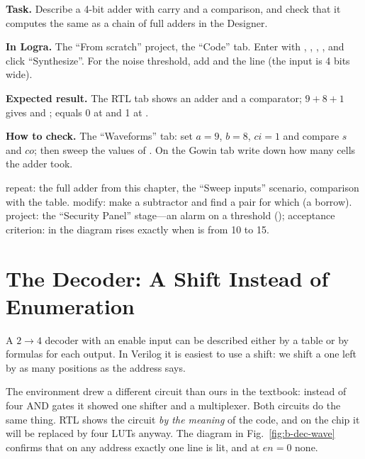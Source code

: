 \begin{diybox}
\textbf{Task.} Describe a 4-bit adder with carry and a comparison, and check that it computes the same as a chain of full adders in the Designer.

\textbf{In Logra.} The ``From scratch'' project, the ``Code'' tab. Enter  with , , , , and click ``Synthesize''. For the noise threshold, add  and the line  (the input  is 4 bits wide).

\textbf{Expected result.} The RTL tab shows an adder and a comparator; $9+8+1$ gives  and ;  equals 0 at  and 1 at .

\textbf{How to check.} The ``Waveforms'' tab: set $a=9$, $b=8$, $ci=1$ and compare $s$ and $co$; then sweep the values of . On the Gowin tab write down how many cells the adder took.

 repeat: the full adder  from this chapter, the ``Sweep inputs'' scenario, comparison with the table.  modify: make a subtractor  and find a pair for which  (a borrow).  project: the ``Security Panel'' stage---an alarm on a threshold (); acceptance criterion: in the diagram  rises exactly when  is from 10 to 15.
\end{diybox}

\section{The Decoder: A Shift Instead of Enumeration}

A $2\to 4$ decoder with an enable input can be described either by a table or by
formulas for each output. In Verilog it is easiest to use a shift:
we shift a one left by as many positions as the address says.



The environment drew a different circuit than ours in the textbook: instead of four AND
gates it showed one \code{<<} shifter and a multiplexer. Both circuits do the same thing.
RTL shows the circuit \emph{by the meaning} of the code, and on the chip it will
be replaced by four LUTs anyway. The diagram in Fig.~\ref{fig:b-dec-wave}
confirms that on any address exactly one line is lit, and at $en = 0$ none.

